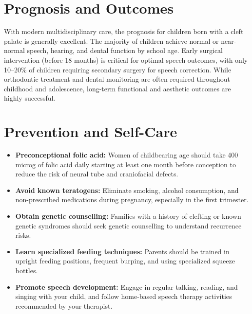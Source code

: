 \section*{Prognosis and Outcomes}
With modern multidisciplinary care, the prognosis for children born with a cleft palate is generally excellent. The majority of children achieve normal or near-normal speech, hearing, and dental function by school age. Early surgical intervention (before 18 months) is critical for optimal speech outcomes, with only 10--20\% of children requiring secondary surgery for speech correction. While orthodontic treatment and dental monitoring are often required throughout childhood and adolescence, long-term functional and aesthetic outcomes are highly successful.

\section*{Prevention and Self-Care}
\begin{itemize}
    \item \textbf{Preconceptional folic acid:} Women of childbearing age should take 400\,microg of folic acid daily starting at least one month before conception to reduce the risk of neural tube and craniofacial defects.
    \item \textbf{Avoid known teratogens:} Eliminate smoking, alcohol consumption, and non-prescribed medications during pregnancy, especially in the first trimester.
    \item \textbf{Obtain genetic counselling:} Families with a history of clefting or known genetic syndromes should seek genetic counselling to understand recurrence risks.
    \item \textbf{Learn specialized feeding techniques:} Parents should be trained in upright feeding positions, frequent burping, and using specialized squeeze bottles.
    \item \textbf{Promote speech development:} Engage in regular talking, reading, and singing with your child, and follow home-based speech therapy activities recommended by your therapist.
\end{itemize}

